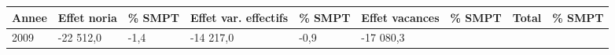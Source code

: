 \begin{longtable}[]{@{}lllllllll@{}}
\toprule
\begin{minipage}[b]{0.05\columnwidth}\raggedright
Annee\strut
\end{minipage} & \begin{minipage}[b]{0.10\columnwidth}\raggedright
Effet noria\strut
\end{minipage} & \begin{minipage}[b]{0.06\columnwidth}\raggedright
\% SMPT\strut
\end{minipage} & \begin{minipage}[b]{0.16\columnwidth}\raggedright
Effet var. effectifs\strut
\end{minipage} & \begin{minipage}[b]{0.06\columnwidth}\raggedright
\% SMPT\strut
\end{minipage} & \begin{minipage}[b]{0.12\columnwidth}\raggedright
Effet vacances\strut
\end{minipage} & \begin{minipage}[b]{0.06\columnwidth}\raggedright
\% SMPT\strut
\end{minipage} & \begin{minipage}[b]{0.09\columnwidth}\raggedright
Total\strut
\end{minipage} & \begin{minipage}[b]{0.06\columnwidth}\raggedright
\% SMPT\strut
\end{minipage}\tabularnewline
\midrule
\endhead
\begin{minipage}[t]{0.05\columnwidth}\raggedright
2009\strut
\end{minipage} & \begin{minipage}[t]{0.10\columnwidth}\raggedright
-22 512,0\strut
\end{minipage} & \begin{minipage}[t]{0.06\columnwidth}\raggedright
-1,4\strut
\end{minipage} & \begin{minipage}[t]{0.16\columnwidth}\raggedright
-14 217,0\strut
\end{minipage} & \begin{minipage}[t]{0.06\columnwidth}\raggedright
-0,9\strut
\end{minipage} & \begin{minipage}[t]{0.12\columnwidth}\raggedright
-17 080,3\strut
\end{minipage} & \begin{minipage}[t]{0.06\columnwidth}\raggedright

\end{minipage}
\end{longtable}
